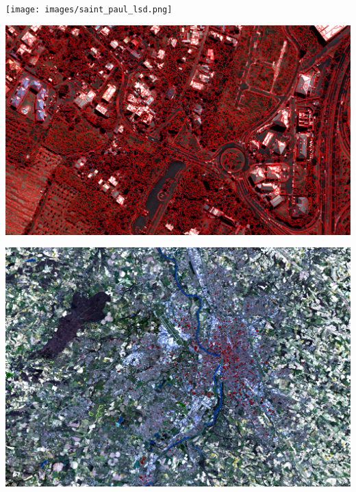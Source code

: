 \documentclass[8pt]{beamer}
\begin{document}
\vspace*{-6.5mm}
\begin{frame}[plain]
\hspace*{-11mm}
\texttt{[image: images/saint\_paul\_lsd.png]}
\end{frame}

\vspace*{-6.5mm}
\begin{frame}[plain]
\hspace*{-11mm}
    \includegraphics[keepaspectratio,height=1.1\paperheight]{images/segmentation.png}
\end{frame}

\vspace*{-6.5mm}
\begin{frame}[plain]
\hspace*{-11mm}
    \includegraphics[keepaspectratio,height=1.1\paperheight]{../../Courses/org/WorkshopGuide/Images/samples_selection.png}
\end{frame}
\end{document}
